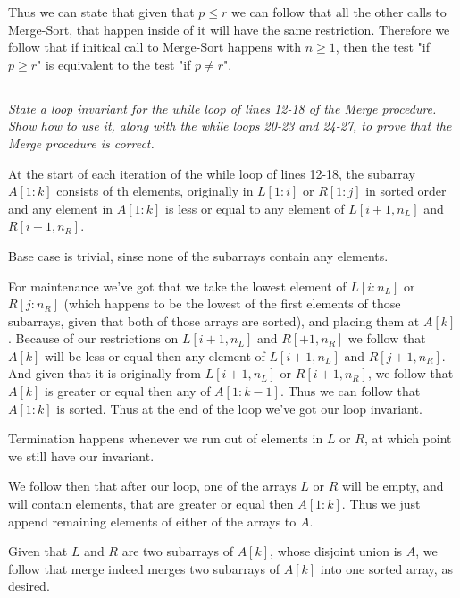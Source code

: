 \documentclass[11pt,oneside,titlepage]{book}
\begin{document}
Thus we can state that given that $p \leq r$ we can follow that all the other calls
to Merge-Sort, that happen inside of it  will have the same restriction.
Therefore we follow that if initical call to Merge-Sort happens with $n \geq 1$, then the test
"if $p \geq r$" is equivalent to the test "if $p \neq r$".

\subsection{}

\textit{State a loop invariant for the while loop of lines 12-18 of the Merge procedure. Show
  how to use it, along with the while loops 20-23 and 24-27, to prove that the Merge procedure
  is correct.}

At the start of each iteration of the while loop of lines 12-18, the subarray $A[1:k]$ consists
of th elements, originally in $L[1:i]$ or $R[1:j]$ in sorted order and any element
in $A[1:k]$ is less or equal to any element of $L[i + 1, n_L]$ and $R[i + 1, n_R]$.

Base case is trivial, sinse none of the subarrays contain any elements.

For maintenance we've got that we take the lowest element of $L[i:n_L]$ or
$R[j:n_R]$ (which happens to be the lowest  of the  first elements of those subarrays, given that
both of those arrays are sorted), and placing them at $A[k]$. Because of
our restrictions on $L[i + 1, n_L]$ and $R[ + 1, n_R]$ we follow that $A[k]$ will be less or
equal then any element of $L[i + 1, n_L]$ and $R[j + 1, n_R]$. And given that it
is originally from $L[i + 1, n_L]$ or $R[i + 1, n_R]$, we follow that $A[k]$ is
greater or equal then any of $A[1:k - 1]$. Thus we can follow that $A[1:k]$ is sorted.
Thus at the end of the loop we've got our loop invariant.

Termination happens whenever we run out of elements in $L$ or $R$, at which point we still have
our invariant.

We follow then that after our loop, one of the arrays $L$ or $R$ will be empty, and
will contain elements, that are greater or equal then $A[1:k]$. Thus we just append
remaining elements of either of the arrays to $A$.


Given that $L$ and $R$ are two subarrays of $A[k]$, whose disjoint union is $A$, we follow that
merge indeed merges two subarrays of $A[k]$ into one sorted array, as desired.

\subsection{}
\end{document}
